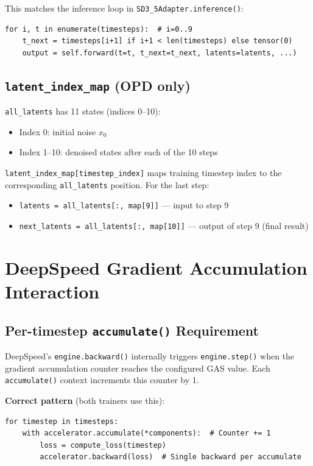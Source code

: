 \documentclass[11pt]{article}
\begin{document}
This matches the inference loop in \texttt{SD3\_5Adapter.inference()}:
\begin{lstlisting}
for i, t in enumerate(timesteps):  # i=0..9
    t_next = timesteps[i+1] if i+1 < len(timesteps) else tensor(0)
    output = self.forward(t=t, t_next=t_next, latents=latents, ...)
\end{lstlisting}

\subsection{\texttt{latent\_index\_map} (OPD only)}

\texttt{all\_latents} has 11 states (indices 0--10):
\begin{itemize}[nosep]
    \item Index 0: initial noise $x_0$
    \item Index 1--10: denoised states after each of the 10 steps
\end{itemize}

\texttt{latent\_index\_map[timestep\_index]} maps training timestep index to the corresponding \texttt{all\_latents} position. For the last step:
\begin{itemize}[nosep]
    \item \texttt{latents = all\_latents[:, map[9]]} --- input to step 9
    \item \texttt{next\_latents = all\_latents[:, map[10]]} --- output of step 9 (final result)
\end{itemize}

\section{DeepSpeed Gradient Accumulation Interaction}

\subsection{Per-timestep \texttt{accumulate()} Requirement}

DeepSpeed's \texttt{engine.backward()} internally triggers \texttt{engine.step()} when the gradient accumulation counter reaches the configured GAS value. Each \texttt{accumulate()} context increments this counter by 1.

\textbf{Correct pattern} (both trainers use this):
\begin{lstlisting}
for timestep in timesteps:
    with accelerator.accumulate(*components):  # Counter += 1
        loss = compute_loss(timestep)
        accelerator.backward(loss)  # Single backward per accumulate
\end{lstlisting}
\end{document}
